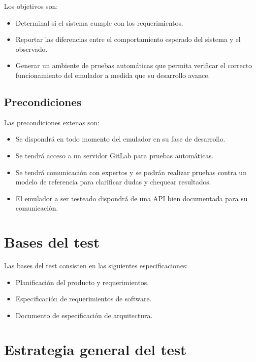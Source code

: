 \documentclass[
  11pt, %
  codirector, %
]{charter}
\begin{document}
Los objetivos son:

\begin{itemize}
\item Determinal si el sistema cumple con los requerimientos.
\item Reportar las diferencias entre el comportamiento esperado del sistema y el observado.
\item Generar un ambiente de pruebas automáticas que permita verificar el correcto funcionamiento del emulador a medida que su desarrollo avance.
\end{itemize}


\subsection{Precondiciones}
\label{sec:org5ca5790}

Las precondiciones extenas son:

\begin{itemize}
\item Se dispondrá en todo momento del emulador en su fase de desarrollo.
\item Se tendrá acceso a un servidor GitLab para pruebas automáticas.
\item Se tendrá comunicación con expertos y se podrán realizar pruebas contra un modelo de referencia para clarificar dudas y chequear resultados.
\item El emulador a ser testeado dispondrá de una API bien documentada para su comunicación.
\end{itemize}


\section{Bases del test}
\label{sec:bases_del_test}

Las bases del test consisten en las siguientes especificaciones:
\begin{itemize}
\item Planificación del producto y requerimientos.
\item Especificación de requerimientos de software.
\item Documento de especificación de arquitectura.
\end{itemize}

\section{Estrategia general del test}
\label{sec:estra_general_test}
\end{document}
